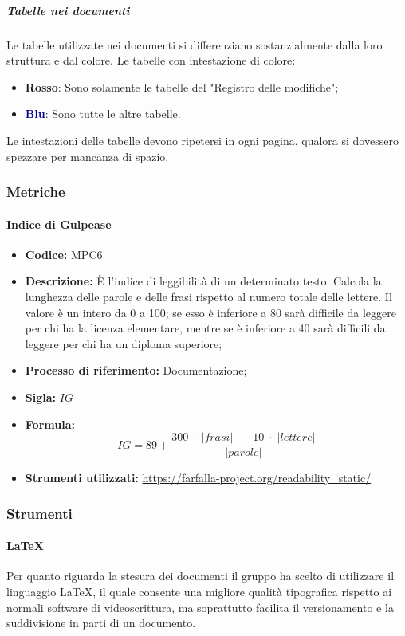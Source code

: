 \subparagraph*{Tabelle nei documenti}
Le tabelle utilizzate nei documenti si differenziano sostanzialmente dalla loro struttura e dal colore.
Le tabelle con intestazione di colore:
\begin{itemize}
    \item \textcolor{rossoep}{\textbf{Rosso}}: Sono solamente le tabelle del "Registro delle modifiche";
    \item \textcolor{darkblue}{\textbf{Blu}}: Sono tutte le altre tabelle.
\end{itemize}
Le intestazioni delle tabelle devono ripetersi in ogni pagina, qualora si dovessero spezzare per mancanza di spazio.

\subsubsection{Metriche}

\paragraph{Indice di Gulpease}
\begin{itemize}
	\item \textbf{Codice:} MPC6
	\item \textbf{Descrizione:} È l'indice di leggibilità di un determinato testo. Calcola la lunghezza delle parole e delle frasi rispetto al numero totale delle lettere. Il valore è un intero da 0 a 100; se esso è inferiore a 80 sarà difficile da leggere per chi ha la licenza elementare, mentre se è inferiore a 40 sarà difficili da leggere per chi ha un diploma superiore;
	\item \textbf{Processo di riferimento:} Documentazione;
	\item \textbf{Sigla:} $IG$
	\item \textbf{Formula:} $$IG = 89 + {\frac{300 \; \cdot \; |frasi| \; - \; 10 \; \cdot \; |lettere|}{|parole|}}$$
	\item \textbf{Strumenti utilizzati:} \url{https://farfalla-project.org/readability_static/}
\end{itemize}

\subsubsection{Strumenti}
\paragraph*{\LaTeX}
Per quanto riguarda la stesura dei documenti il gruppo ha scelto di utilizzare il linguaggio \LaTeX{}, il quale consente una migliore qualità tipografica rispetto ai normali software di videoscrittura, ma soprattutto facilita il versionamento e la suddivisione in parti di un documento.

